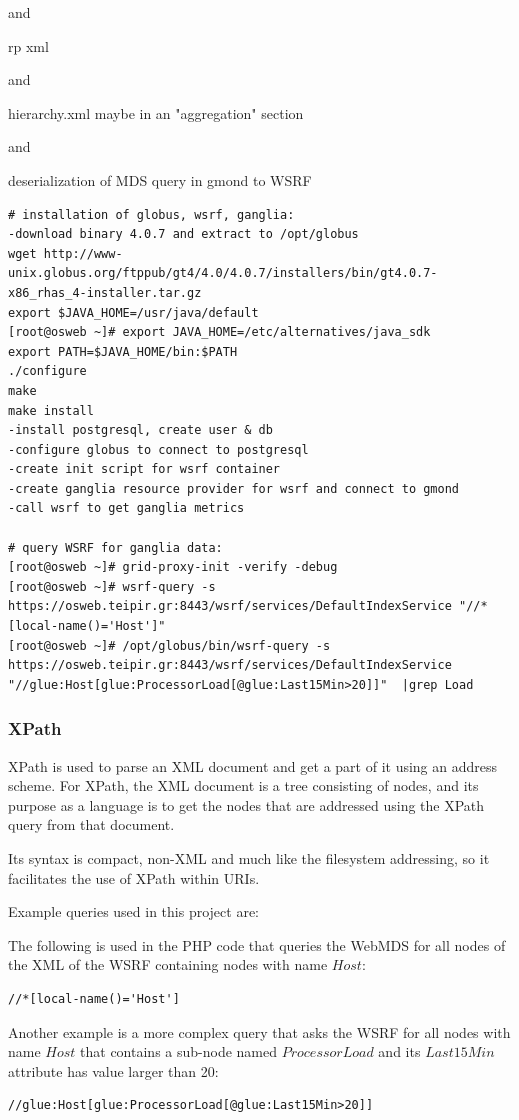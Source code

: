 and

rp xml

and

hierarchy.xml maybe in an "aggregation" section

and

deserialization of MDS query in gmond to WSRF
 
\begin{verbatim}
# installation of globus, wsrf, ganglia:
-download binary 4.0.7 and extract to /opt/globus
wget http://www-unix.globus.org/ftppub/gt4/4.0/4.0.7/installers/bin/gt4.0.7-x86_rhas_4-installer.tar.gz
export $JAVA_HOME=/usr/java/default
[root@osweb ~]# export JAVA_HOME=/etc/alternatives/java_sdk
export PATH=$JAVA_HOME/bin:$PATH
./configure
make
make install
-install postgresql, create user & db
-configure globus to connect to postgresql
-create init script for wsrf container
-create ganglia resource provider for wsrf and connect to gmond
-call wsrf to get ganglia metrics

# query WSRF for ganglia data:
[root@osweb ~]# grid-proxy-init -verify -debug
[root@osweb ~]# wsrf-query -s https://osweb.teipir.gr:8443/wsrf/services/DefaultIndexService "//*[local-name()='Host']"
[root@osweb ~]# /opt/globus/bin/wsrf-query -s https://osweb.teipir.gr:8443/wsrf/services/DefaultIndexService "//glue:Host[glue:ProcessorLoad[@glue:Last15Min>20]]"  |grep Load
\end{verbatim}

\subsubsection{XPath}

XPath is used to parse an XML document and get a part of it using an address scheme. For XPath, the XML document is a tree consisting of nodes, and its purpose as a language is to get the nodes that are addressed using the XPath query from that document.

Its syntax is compact, non-XML and much like the filesystem addressing, so it facilitates the use of XPath within URIs.

Example queries used in this project are:

The following is used in the PHP code that queries the WebMDS for all nodes of the XML of the WSRF containing nodes with name $Host$:
\begin{verbatim}
//*[local-name()='Host']
\end{verbatim}

Another example is a more complex query that asks the WSRF for all nodes with name $Host$ that contains a sub-node named $ProcessorLoad$ and its $Last15Min$ attribute has value larger than 20:
\begin{verbatim}
//glue:Host[glue:ProcessorLoad[@glue:Last15Min>20]]
\end{verbatim}

